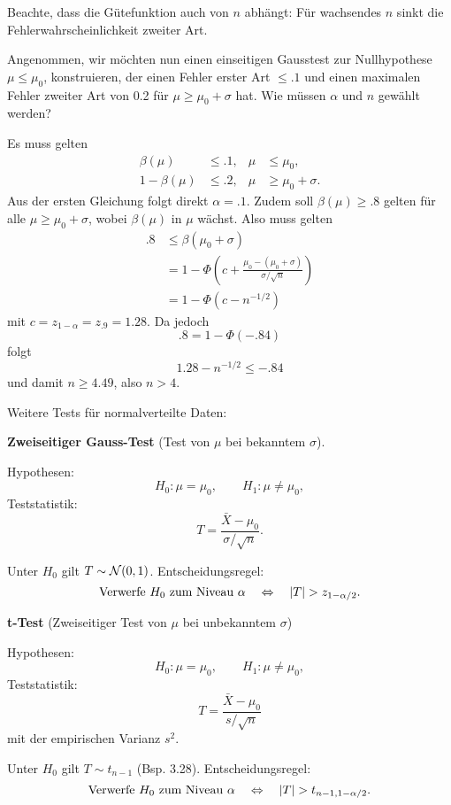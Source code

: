 \begin{exmp}
  Beachte, dass die Gütefunktion auch von $n$ abhängt: Für wachsendes $n$ sinkt
  die Fehlerwahrscheinlichkeit zweiter Art.

  Angenommen, wir möchten nun einen einseitigen Gausstest zur Nullhypothese $\mu
  \le \mu_0$, konstruieren, der einen Fehler erster Art $\le \num{.1}$ und einen 
  maximalen Fehler zweiter Art von \num{.2} für $\mu \ge \mu_0 + \sigma$ hat.
  Wie müssen $\alpha$ und $n$ gewählt werden?

  Es muss gelten
  \[ \begin{aligned}
      \beta(\mu) &\le \num{.1}, & \mu &\le \mu_0, \\
      1 - \beta(\mu) &\le \num{.2}, & \mu &\ge \mu_0 + \sigma.
    \end{aligned}
  \]
  Aus der ersten Gleichung folgt direkt $\alpha = \num{.1}$. Zudem soll
  $\beta(\mu) \ge \num{.8}$ gelten für alle $\mu \ge \mu_0 + \sigma$, wobei
  $\beta(\mu)$ in $\mu$ wächst. Also muss gelten
  \begin{align*}
    \num{.8}
    &\le \beta(\mu_0 + \sigma) \\
    &= 1 - \Phi \left(
      c + \frac{\mu_0 - (\mu_0 + \sigma)}{\sigma / \sqrt{n}}
      \right) \\
    &= 1 - \Phi( c - n^{-1/2})
  \end{align*}
  mit $c = z_{1-\alpha} = z_{\num{.9}} = \num{1.28}$. Da jedoch
  \[ \num{.8} = 1 - \Phi(\num{-.84}) \]
  folgt
  \[ \num{1.28} - n^{-1/2} \le \num{-.84} \]
  und damit $n \ge \num{4.49}$, also $n > 4$.
\end{exmp}

\clearpage

Weitere Tests für normalverteilte Daten:
\begin{mdframed}
  \textbf{Zweiseitiger Gauss-Test}
  (Test von $\mu$ bei bekanntem $\sigma$).
  
  Hypothesen:
  \[ H_0 : \mu = \mu_0, \qquad H_1 : \mu \ne \mu_0, \]
  Teststatistik:
  \[ T = \frac{\bar{X}-\mu_0}{\sigma/\sqrt{n}}. \]

  Unter $H_0$ gilt $T \sim \mathcal{N}(0,1)$. Entscheidungsregel:
  \[ \text{Verwerfe $H_0$ zum Niveau $\alpha$} \quad \Leftrightarrow \quad |T| > z_{1-\alpha/2}. \]
\end{mdframed}

\begin{mdframed}
  \textbf{t-Test} (Zweiseitiger Test von $\mu$ bei unbekanntem $\sigma$)

  Hypothesen:
  \[ H_0 : \mu = \mu_0, \qquad H_1 : \mu \ne \mu_0, \]
  Teststatistik:
  \[ T = \frac{\bar{X}-\mu_0}{s/\sqrt{n}} \]
  mit der empirischen Varianz $s^2$.

  Unter $H_0$ gilt $T \sim t_{n-1}$ (Bsp. 3.28). Entscheidungsregel:
  \[ \text{Verwerfe $H_0$ zum Niveau $\alpha$} \quad \Leftrightarrow \quad |T| > t_{n-1,1-\alpha/2}. \]
\end{mdframed}

